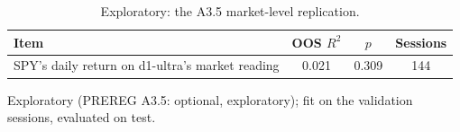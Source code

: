 \begin{table}[htbp]
\centering
\small
\begin{threeparttable}
\caption{Exploratory: the A3.5 market-level replication.}\label{tab:a-market-replication}
\begin{tabular}{@{}lS[table-format=1.3]S[table-format=1.3]S[table-format=3.0]@{}}
\toprule
Item & {OOS $R^2$} & {$p$} & {Sessions} \\
\midrule
SPY's daily return on d1-ultra's market reading & 0.021 & 0.309 & 144 \\
\bottomrule
\end{tabular}
\begin{tablenotes}[flushleft]\footnotesize
\item Exploratory (PREREG A3.5: optional, exploratory); fit on the validation sessions, evaluated on test.
\end{tablenotes}
\end{threeparttable}
\end{table}
